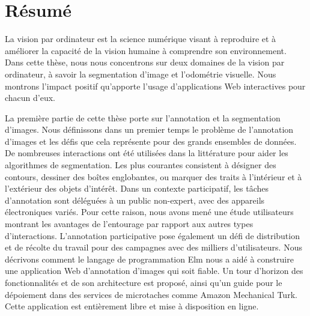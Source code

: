 \section*{Résumé}%
\label{sec:resume}

La vision par ordinateur est la science numérique visant à reproduire et à améliorer
la capacité de la vision humaine à comprendre son environnement.
Dans cette thèse, nous nous concentrons sur deux domaines de la vision par ordinateur,
à savoir la segmentation d'image et l'odométrie visuelle.
Nous montrons l'impact positif qu'apporte l'usage
d'applications Web interactives pour chacun d'eux.

La première partie de cette thèse porte sur l'annotation et la segmentation d'images.
Nous définissons dans un premier temps le problème de l'annotation d'images
et les défis que cela représente pour des grands ensembles de données.
De nombreuses interactions ont été utilisées dans la littérature
pour aider les algorithmes de segmentation.
Les plus courantes consistent à désigner des contours,
dessiner des boîtes englobantes,
ou marquer des traits à l'intérieur et à l'extérieur des objets d'intérêt.
Dans un contexte participatif, les tâches d'annotation sont déléguées
à un public non-expert, avec des appareils électroniques variés.
Pour cette raison, nous avons mené une étude utilisateurs montrant
les avantages de l'entourage par rapport aux autres types d'interactions.
L'annotation participative pose également un défi de distribution et de récolte du travail
pour des campagnes avec des milliers d'utilisateurs.
Nous décrivons comment le langage de programmation Elm nous a aidé à
construire une application Web d'annotation d'images qui soit fiable.
Un tour d'horizon des fonctionnalités et de son architecture est proposé,
ainsi qu'un guide pour le dépoiement dans des services de microtaches comme Amazon Mechanical Turk.
Cette application est entièrement libre et mise à disposition en ligne.

